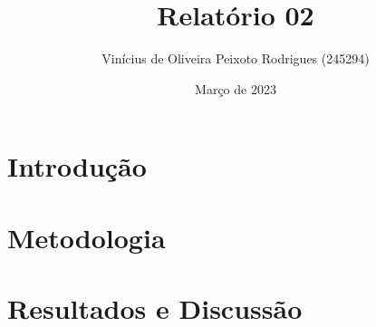 \documentclass{article}
\title{Relatório 02}
\author{Vinícius de Oliveira Peixoto Rodrigues (245294)}
\date{Março de 2023}
\begin{document}
\maketitle

\section{Introdução}

\section{Metodologia}

\section{Resultados e Discussão}
\end{document}
